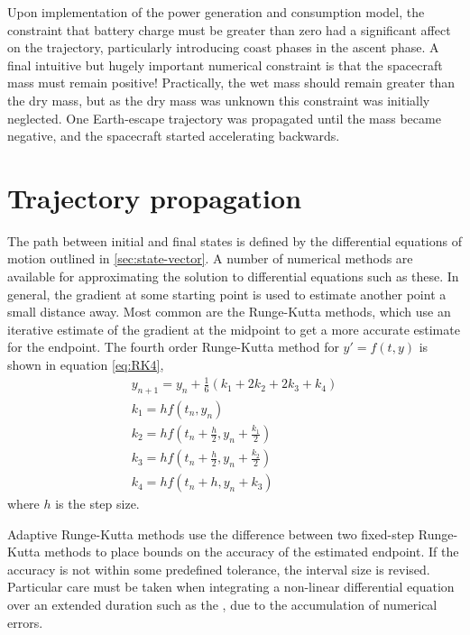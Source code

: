 Upon implementation of the power generation and consumption model, the constraint that battery charge must be greater than zero had a significant affect on the trajectory, particularly introducing coast phases in the ascent phase. A final intuitive but hugely important numerical constraint is that the spacecraft mass must remain positive! Practically, the wet mass should remain greater than the dry mass, but as the dry mass was unknown this constraint was initially neglected. One Earth-escape trajectory was propagated until the mass became negative, and the spacecraft started accelerating backwards.


\section{Trajectory propagation} \label{sec:Propagation}
The path between initial and final states is defined by the differential equations of motion outlined in \autoref{sec:state-vector}. A number of numerical methods are available for approximating the solution to differential equations such as these. In general, the gradient at some starting point is used to estimate another point a small distance away. Most common are the Runge-Kutta methods, which use an iterative estimate of the gradient at the midpoint to get a more accurate estimate for the endpoint. The fourth order Runge-Kutta method for $y'=f(t,y)$ is shown in equation \eqref{eq:RK4},
\begin{subequations}
\begin{gather} \label{eq:RK4}
y_{n+1}=y_n+\frac{1}{6}\left(k_1+2k_2+2k_3+k_4\right) \\
k_1=hf\left(t_n,y_n\right) \\
k_2=hf\left(t_n+\frac{h}{2},y_n+\frac{k_1}{2}\right) \\
k_3=hf\left(t_n+\frac{h}{2},y_n+\frac{k_2}{2}\right) \\
k_4=hf\left(t_n+h,y_n+k_3\right)
\end{gather}
\end{subequations}
where $h$ is the step size.

Adaptive Runge-Kutta methods use the difference between two fixed-step Runge-Kutta methods to place bounds on the accuracy of the estimated endpoint. If the accuracy is not within some predefined tolerance, the interval size is revised. Particular care must be taken when integrating a non-linear differential equation over an extended duration such as the \BW, due to the accumulation of numerical errors.

